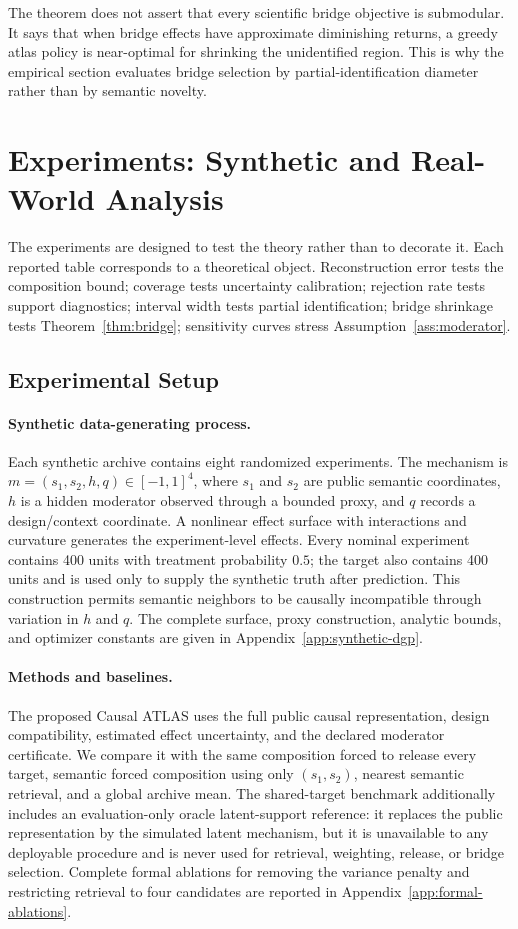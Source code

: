 \documentclass[11pt]{article}
\numberwithin{equation}{section}
\newcommand{\1}{\mathbf 1}
\begin{document}
The theorem does not assert that every scientific bridge objective is submodular.  It says that when bridge effects have approximate diminishing returns, a greedy atlas policy is near-optimal for shrinking the unidentified region.  This is why the empirical section evaluates bridge selection by partial-identification diameter rather than by semantic novelty.

\section{Experiments: Synthetic and Real-World Analysis}
\label{sec:experiments}

The experiments are designed to test the theory rather than to decorate it.  Each reported table corresponds to a theoretical object.  Reconstruction error tests the composition bound; coverage tests uncertainty calibration; rejection rate tests support diagnostics; interval width tests partial identification; bridge shrinkage tests Theorem~\ref{thm:bridge}; sensitivity curves stress Assumption~\ref{ass:moderator}.

\subsection{Experimental Setup}
\paragraph{Synthetic data-generating process.}
Each synthetic archive contains eight randomized experiments.  The mechanism is $m=(s_1,s_2,h,q)\in[-1,1]^4$, where $s_1$ and $s_2$ are public semantic coordinates, $h$ is a hidden moderator observed through a bounded proxy, and $q$ records a design/context coordinate.  A nonlinear effect surface with interactions and curvature generates the experiment-level effects.  Every nominal experiment contains 400 units with treatment probability $0.5$; the target also contains 400 units and is used only to supply the synthetic truth after prediction.  This construction permits semantic neighbors to be causally incompatible through variation in $h$ and $q$.  The complete surface, proxy construction, analytic bounds, and optimizer constants are given in 
Appendix~\ref{app:synthetic-dgp}.
\paragraph{Methods and baselines.}
The proposed Causal ATLAS uses the full public causal representation, design compatibility, estimated effect uncertainty, and the declared moderator certificate.  We compare it with the same composition forced to release every target, semantic forced composition using only $(s_1,s_2)$, nearest semantic retrieval, and a global archive mean.  The shared-target benchmark additionally includes an evaluation-only oracle latent-support reference: it replaces the public representation by the simulated latent mechanism, but it is unavailable to any deployable procedure and is never used for retrieval, weighting, release, or bridge selection.  Complete formal ablations for removing the variance penalty and restricting retrieval to four candidates are reported in Appendix~\ref{app:formal-ablations}.
\end{document}
